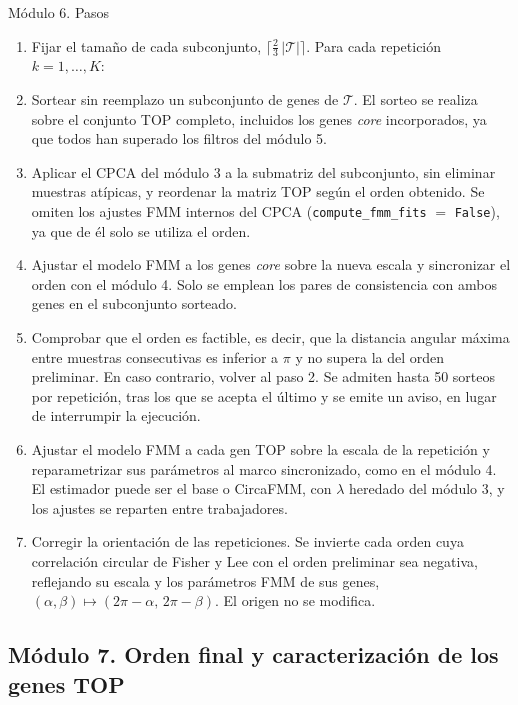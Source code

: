 \documentclass[12pt, a4paper]{report}
\newcommand{\nuevo}[1]{\textcolor{cnuevo}{#1}}
\newenvironment{pasos}{\begin{enumerate}[nosep,leftmargin=1.5em,label=\arabic*.]}{\end{enumerate}}
\begin{document}
\begin{panel}{Módulo 6. Pasos}
\begin{pasos}
\item Fijar el tamaño de cada subconjunto, \(\lceil \tfrac{2}{3}\,|\mathcal{T}|\rceil\). Para cada repetición \(k=1,\ldots,K\):
\item Sortear sin reemplazo un subconjunto de genes de \(\mathcal{T}\). \nuevo{El sorteo se realiza sobre el conjunto TOP completo, incluidos los genes \textit{core} incorporados, ya que todos han superado los filtros del módulo 5.}
\item Aplicar el CPCA del módulo 3 a la submatriz del subconjunto, sin eliminar muestras atípicas, y reordenar la matriz TOP según el orden obtenido. \nuevo{Se omiten los ajustes FMM internos del CPCA (\texttt{compute\_fmm\_fits} \(=\) \texttt{False}), ya que de él solo se utiliza el orden.}
\item Ajustar el modelo FMM a los genes \textit{core} sobre la nueva escala y sincronizar el orden con el módulo 4. \nuevo{Solo se emplean los pares de consistencia con ambos genes en el subconjunto sorteado.}
\item Comprobar que el orden es factible, es decir, que la distancia angular máxima entre muestras consecutivas es inferior a \(\pi\) y no supera la del orden preliminar. En caso contrario, volver al paso 2. \nuevo{Se admiten hasta 50 sorteos por repetición, tras los que se acepta el último y se emite un aviso, en lugar de interrumpir la ejecución.}
\item Ajustar el modelo FMM a cada gen TOP sobre la escala de la repetición y reparametrizar sus parámetros al marco sincronizado, como en el módulo 4. \nuevo{El estimador puede ser el base o CircaFMM, con \(\lambda\) heredado del módulo 3, y los ajustes se reparten entre trabajadores.}
\item \nuevo{Corregir la orientación de las repeticiones. Se invierte cada orden cuya correlación circular de Fisher y Lee con el orden preliminar sea negativa, reflejando su escala y los parámetros FMM de sus genes, \((\alpha,\beta)\mapsto(2\pi-\alpha,\,2\pi-\beta)\). El origen no se modifica.}
\end{pasos}
\end{panel}

\subsection{Módulo 7. Orden final y caracterización de los genes TOP}
\end{document}
